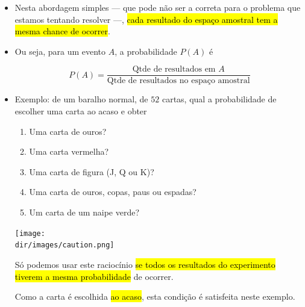 \documentclass[
  11pt]{report}
\newcommand{\dir}{/ssd/R/x86_64-pc-linux-gnu-library/4.2/fnaufelRmd/rmarkdown/resources}
\newenvironment{rmdcaution}
{
  \begin{mycaution}
    \texttt{[image: \\dir/images/caution.png]}
    \tcblower
  }
  {
  \end{mycaution}
}
\begin{document}
\begin{itemize}
\item
  Nesta abordagem simples --- que pode não ser a correta para o problema que estamos tentando resolver ---, {\hl{cada resultado do espaço amostral tem a mesma chance de ocorrer}}.
\item
  Ou seja, para um evento $A$, a probabilidade $P(A)$ é

  \[
  P(A) = \frac{\text{Qtde de resultados em } A}{\text{Qtde de resultados no espaço amostral}}
  \]
\item
  Exemplo: de um baralho normal, de $52$ cartas, qual a probabilidade de escolher uma carta ao acaso e obter

  \begin{enumerate}
  \def\labelenumi{\arabic{enumi}.}
  \item
    Uma carta de ouros?

  \item
    Uma carta vermelha?

  \item
    Uma carta de figura (J, Q ou K)?

  \item
    Uma carta de ouros, copas, paus ou espadas?

  \item
    Um carta de um naipe verde?

  \end{enumerate}

  \begin{rmdcaution}
  Só podemos usar este raciocínio {\hl{se todos os resultados do experimento tiverem a mesma probabilidade}} de ocorrer.

  Como a carta é escolhida {\hl{ao acaso}}, esta condição é satisfeita neste exemplo.

  \end{rmdcaution}
\end{itemize}
\end{document}
